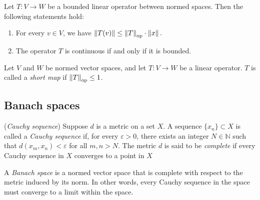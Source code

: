 \begin{lemma} \cite[Lemma 6.4]{InfiniteDimensionalAnalysis2006} \label{lemma:op_norm_submult} %
Let \( T: V \rightarrow W \) be a bounded linear operator between normed spaces. Then the following statements hold:
\begin{enumerate}
  \item For every \( v \in V \), we have $
  \left\lVert T(v) \right\rVert \leq \left\lVert T \right\rVert_{\text{op}} \cdot \left\lVert x \right\rVert.$
  \item The operator \( T \) is continuous if and only if it is bounded.
\end{enumerate}
\end{lemma}




\begin{definition}
  Let \( V \) and \( W \) be normed vector spaces, and let \( T: V \rightarrow W \) be a linear operator. $T$ is called a \emph{short map} if $\left\lVert T \right\rVert_{\text{op}} \leq 1$.
\end{definition}



\subsection{Banach spaces}


\begin{definition} (\emph{Cauchy sequence})
  Suppose $ d $ is a metric on a set $ X $. A sequence $ \{x_n\} \subset X $ is called a \emph{Cauchy sequence} if, for every $ \varepsilon > 0 $, there exists an integer $N \in \mathbb{N} $ such that $ d(x_m, x_n) < \varepsilon $ for all $ m, n > N $.  The metric \( d \) is said to be \emph{complete} if every Cauchy sequence in \( X \) converges to a point in \( X \)
\end{definition}

\begin{definition}
  A \emph{Banach space} is a normed vector space that is complete with respect to the metric induced by its norm. In other words, every Cauchy sequence in the space must converge to a limit within the space.
\end{definition}
 





